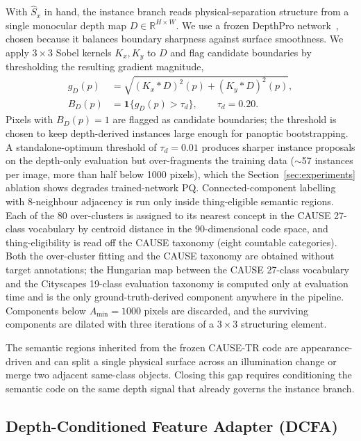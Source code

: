 \documentclass[10pt,twocolumn,letterpaper]{article}
\begin{document}
With $\hat S_x$ in hand, the instance branch reads physical-separation structure from a single monocular depth map $D \in \mathbb{R}^{H \times W}$. We use a frozen DepthPro network~\cite{bochkovskii2024depthpro}, chosen because it balances boundary sharpness against surface smoothness. We apply $3 \times 3$ Sobel kernels $K_x, K_y$ to $D$ and flag candidate boundaries by thresholding the resulting gradient magnitude,
\begin{equation}
\begin{aligned}
g_D(p) &= \sqrt{(K_x * D)^2(p) + (K_y * D)^2(p)}, \\
B_D(p) &= \mathbf{1}\{g_D(p) > \tau_d\}, \qquad \tau_d = 0.20 .
\end{aligned}
\label{eq:depth_boundary}
\end{equation}
Pixels with $B_D(p)=1$ are flagged as candidate boundaries; the threshold is chosen to keep depth-derived instances large enough for panoptic bootstrapping. A standalone-optimum threshold of $\tau_d = 0.01$ produces sharper instance proposals on the depth-only evaluation but over-fragments the training data ($\sim$57 instances per image, more than half below 1000 pixels), which the Section~\ref{sec:experiments} ablation shows degrades trained-network PQ. Connected-component labelling with 8-neighbour adjacency is run only inside thing-eligible semantic regions. Each of the 80 over-clusters is assigned to its nearest concept in the CAUSE 27-class vocabulary by centroid distance in the 90-dimensional code space, and thing-eligibility is read off the CAUSE taxonomy (eight countable categories). Both the over-cluster fitting and the CAUSE taxonomy are obtained without target annotations; the Hungarian map between the CAUSE 27-class vocabulary and the Cityscapes 19-class evaluation taxonomy is computed only at evaluation time and is the only ground-truth-derived component anywhere in the pipeline. Components below $A_\text{min} = 1000$ pixels are discarded, and the surviving components are dilated with three iterations of a $3 \times 3$ structuring element.

The semantic regions inherited from the frozen CAUSE-TR code are appearance-driven and can split a single physical surface across an illumination change or merge two adjacent same-class objects. Closing this gap requires conditioning the semantic code on the same depth signal that already governs the instance branch.


\subsection{Depth-Conditioned Feature Adapter (DCFA)}
\label{sec:method:dcfa}
\end{document}
